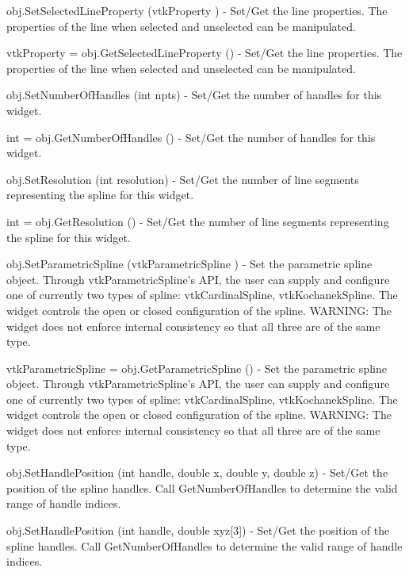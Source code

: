 \begin{DoxyItemize}
\item {\ttfamily obj.\-Set\-Selected\-Line\-Property (vtk\-Property )} -\/ Set/\-Get the line properties. The properties of the line when selected and unselected can be manipulated.  
\item {\ttfamily vtk\-Property = obj.\-Get\-Selected\-Line\-Property ()} -\/ Set/\-Get the line properties. The properties of the line when selected and unselected can be manipulated.  
\item {\ttfamily obj.\-Set\-Number\-Of\-Handles (int npts)} -\/ Set/\-Get the number of handles for this widget.  
\item {\ttfamily int = obj.\-Get\-Number\-Of\-Handles ()} -\/ Set/\-Get the number of handles for this widget.  
\item {\ttfamily obj.\-Set\-Resolution (int resolution)} -\/ Set/\-Get the number of line segments representing the spline for this widget.  
\item {\ttfamily int = obj.\-Get\-Resolution ()} -\/ Set/\-Get the number of line segments representing the spline for this widget.  
\item {\ttfamily obj.\-Set\-Parametric\-Spline (vtk\-Parametric\-Spline )} -\/ Set the parametric spline object. Through vtk\-Parametric\-Spline's A\-P\-I, the user can supply and configure one of currently two types of spline\-: vtk\-Cardinal\-Spline, vtk\-Kochanek\-Spline. The widget controls the open or closed configuration of the spline. W\-A\-R\-N\-I\-N\-G\-: The widget does not enforce internal consistency so that all three are of the same type.  
\item {\ttfamily vtk\-Parametric\-Spline = obj.\-Get\-Parametric\-Spline ()} -\/ Set the parametric spline object. Through vtk\-Parametric\-Spline's A\-P\-I, the user can supply and configure one of currently two types of spline\-: vtk\-Cardinal\-Spline, vtk\-Kochanek\-Spline. The widget controls the open or closed configuration of the spline. W\-A\-R\-N\-I\-N\-G\-: The widget does not enforce internal consistency so that all three are of the same type.  
\item {\ttfamily obj.\-Set\-Handle\-Position (int handle, double x, double y, double z)} -\/ Set/\-Get the position of the spline handles. Call Get\-Number\-Of\-Handles to determine the valid range of handle indices.  
\item {\ttfamily obj.\-Set\-Handle\-Position (int handle, double xyz\mbox{[}3\mbox{]})} -\/ Set/\-Get the position of the spline handles. Call Get\-Number\-Of\-Handles to determine the valid range of handle indices.  

\end{DoxyItemize}
